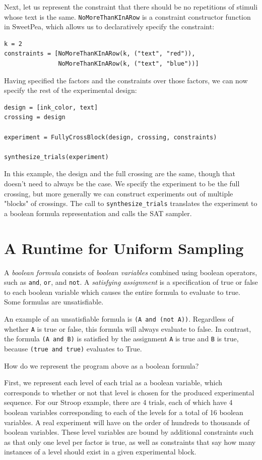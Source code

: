 Next, let us represent the constraint that there should be no repetitions of stimuli whose text is the same. \texttt{NoMoreThanKInARow} is a constraint constructor function in SweetPea, which allows us to declaratively specify the constraint:

\begin{verbatim}
k = 2
constraints = [NoMoreThanKInARow(k, ("text", "red")),
               NoMoreThanKInARow(k, ("text", "blue"))]
\end{verbatim}

Having specified the factors and the constraints over those factors, we can now specify the rest of the experimental design:

\begin{verbatim}
design = [ink_color, text]
crossing = design

experiment = FullyCrossBlock(design, crossing, constraints)

synthesize_trials(experiment)
\end{verbatim}

In this example, the design and the full crossing are the same, though that doesn't need to always be the case. We specify the experiment to be the full crossing, but more generally we can construct experiments out of multiple "blocks" of crossings. The call to \texttt{synthesize\_trials} translates the experiment to a boolean formula representation and calls the SAT sampler.

\section{A Runtime for Uniform Sampling}

A \emph{boolean formula} consists of \emph{boolean variables} combined using boolean operators, such as \texttt{and}, \texttt{or}, and \texttt{not}. A \emph{satisfying assignment} is a specification of true or false to each boolean variable which causes the entire formula to evaluate to true. Some formulas are unsatisfiable.

An example of an unsatisfiable formula is \texttt{(A and (not A))}. Regardless of whether \texttt{A} is true or false, this formula will always evaluate to false. In contrast, the formula \texttt{(A and B)} is satisfied by the assignment \texttt{A} is true and \texttt{B} is true, because \texttt{(true and true)} evaluates to True.

How do we represent the program above as a boolean formula?

First, we represent each level of each trial as a boolean variable, which corresponds to whether or not that level is chosen for the produced experimental sequence. For our Stroop example, there are 4 trials, each of which have 4 boolean variables corresponding to each of the levels for a total of 16 boolean variables. A real experiment will have on the order of hundreds to thousands of boolean variables. These level variables are bound by additional constraints such as that only one level per factor is true, as well as constraints that say how many instances of a level should exist in a given experimental block.

